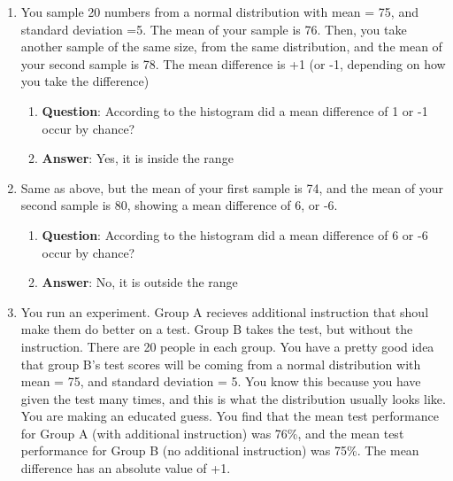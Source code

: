 \documentclass[]{book}
\providecommand{\tightlist}{%
  \setlength{\itemsep}{0pt}\setlength{\parskip}{0pt}}
\theoremstyle{definition}
\theoremstyle{definition}
\theoremstyle{definition}
\theoremstyle{remark}
\begin{document}
\begin{enumerate}
\def\labelenumi{\arabic{enumi}.}
\item
  You sample 20 numbers from a normal distribution with mean = 75, and
  standard deviation =5. The mean of your sample is 76. Then, you take
  another sample of the same size, from the same distribution, and the
  mean of your second sample is 78. The mean difference is +1 (or -1,
  depending on how you take the difference)

  \begin{enumerate}
  \def\labelenumii{\alph{enumii}.}
  \tightlist
  \item
    \textbf{Question}: According to the histogram did a mean difference
    of 1 or -1 occur by chance?
  \item
    \textbf{Answer}: Yes, it is inside the range
  \end{enumerate}
\item
  Same as above, but the mean of your first sample is 74, and the mean
  of your second sample is 80, showing a mean difference of 6, or -6.

  \begin{enumerate}
  \def\labelenumii{\alph{enumii}.}
  \tightlist
  \item
    \textbf{Question}: According to the histogram did a mean difference
    of 6 or -6 occur by chance?
  \item
    \textbf{Answer}: No, it is outside the range
  \end{enumerate}
\item
  You run an experiment. Group A recieves additional instruction that
  shoul make them do better on a test. Group B takes the test, but
  without the instruction. There are 20 people in each group. You have a
  pretty good idea that group B's test scores will be coming from a
  normal distribution with mean = 75, and standard deviation = 5. You
  know this because you have given the test many times, and this is what
  the distribution usually looks like. You are making an educated guess.
  You find that the mean test performance for Group A (with additional
  instruction) was 76\%, and the mean test performance for Group B (no
  additional instruction) was 75\%. The mean difference has an absolute
  value of +1.


\end{enumerate}
\end{document}
